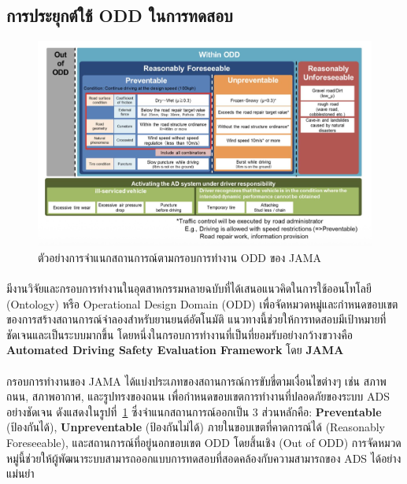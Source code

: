 \subsection{การประยุกต์ใช้ ODD ในการทดสอบ}

\begin{figure}[htbp]
    \centering
    \includegraphics[width=1\textwidth]{images/jama-odd-example}
    \caption{ตัวอย่างการจำแนกสถานการณ์ตามกรอบการทำงาน ODD ของ JAMA \cite{jama2022framework}}
    \label{fig:jama_odd_example}
\end{figure}

\paragraph{}
มีงานวิจัยและกรอบการทำงานในอุตสาหกรรมหลายฉบับที่ได้เสนอแนวคิดในการใช้ออนโทโลยี (Ontology) หรือ Operational Design Domain (ODD) เพื่อจัดหมวดหมู่และกำหนดขอบเขตของการสร้างสถานการณ์จำลองสำหรับยานยนต์อัตโนมัติ \cite{bagschik2018ontology} แนวทางนี้ช่วยให้การทดสอบมีเป้าหมายที่ชัดเจนและเป็นระบบมากขึ้น โดยหนึ่งในกรอบการทำงานที่เป็นที่ยอมรับอย่างกว้างขวางคือ \textbf{Automated Driving Safety Evaluation Framework} โดย \textbf{JAMA} \cite{jama2022framework}

\paragraph{}
กรอบการทำงานของ JAMA ได้แบ่งประเภทของสถานการณ์การขับขี่ตามเงื่อนไขต่างๆ เช่น สภาพถนน, สภาพอากาศ, และรูปทรงของถนน เพื่อกำหนดขอบเขตการทำงานที่ปลอดภัยของระบบ ADS อย่างชัดเจน ดังแสดงในรูปที่~\ref{fig:jama_odd_example} ซึ่งจำแนกสถานการณ์ออกเป็น 3 ส่วนหลักคือ: \textbf{Preventable} (ป้องกันได้), \textbf{Unpreventable} (ป้องกันไม่ได้) ภายในขอบเขตที่คาดการณ์ได้ (Reasonably Foreseeable), และสถานการณ์ที่อยู่นอกขอบเขต ODD โดยสิ้นเชิง (Out of ODD) การจัดหมวดหมู่นี้ช่วยให้ผู้พัฒนาระบบสามารถออกแบบการทดสอบที่สอดคล้องกับความสามารถของ ADS ได้อย่างแม่นยำ


